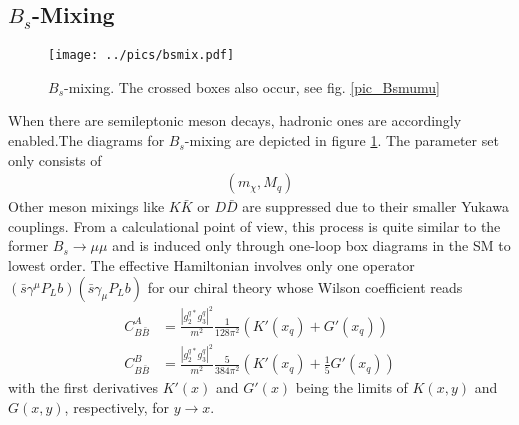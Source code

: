 \subsection{$B_s$-Mixing}
\begin{figure}[t]
 \texttt{[image: ../pics/bsmix.pdf]}
 \caption{$B_s$-mixing. The crossed boxes also occur, see fig. \ref{pic_Bsmumu}}
 \label{pic_Bsmix}
\end{figure}
When there are semileptonic meson decays, hadronic ones are accordingly enabled.The diagrams for $B_s$-mixing are depicted in figure \ref{pic_Bsmix}. 
The parameter set only consists of
\begin{align}
 \left(m_\chi,M_q\right)
\end{align}
Other
meson mixings like $K\bar K$ or $ D \bar D$ are suppressed due to their smaller Yukawa couplings. From a calculational point of view, this process is 
quite similar to the former $B_s\rightarrow \mu\mu$ and is induced only through one-loop box diagrams in the SM to lowest order. The effective Hamiltonian
involves only one operator $(\bar s \gamma^\mu P_L b)(\bar s \gamma_\mu P_L b)$ for our chiral theory whose Wilson coefficient reads
\begin{align}
 C_{B\bar B}^A &=  \frac{|g_2^{q*}g_3^q|^2}{m^2} \frac{1}{128\pi^2} \left(K'(x_q) + G'(x_q)\right)\\
 C_{B\bar B}^B &=  \frac{|g_2^{q*}g_3^q|^2}{m^2} \frac{5}{384\pi^2} \left(K'(x_q) + \frac15 G'(x_q)\right)
 \label{eq_WilsonMix}
\end{align}
with the first derivatives $K'(x)$ and $G'(x)$ being the limits of $K(x,y)$ and $G(x,y)$, respectively, for $y\rightarrow x$. 

